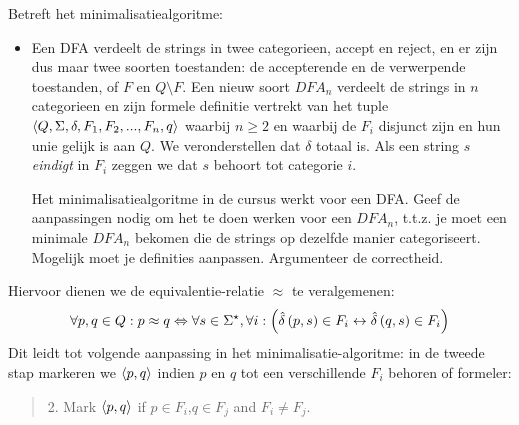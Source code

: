 \documentclass{article}
\begin{document}
\begin{question}
Betreft het minimalisatiealgoritme:
\begin{itemize}

\item[]
Een DFA verdeelt de strings in twee categorieen, accept en reject, en
er zijn dus maar twee soorten toestanden: de accepterende en de
verwerpende toestanden, of $F$ en $Q\setminus F$. Een nieuw soort
$DFA_n$ verdeelt de strings in $n$ categorieen en zijn formele
definitie vertrekt van het tuple
$\left\langle Q,\Sigma,\delta,F_1,F_2,...,F_n,q \right\rangle$ waarbij $n \geq 2$ en
waarbij de $F_i$ disjunct zijn en hun unie gelijk is aan $Q$. We
veronderstellen dat $\delta$ totaal is. Als een string $s$ {\em eindigt}
in $F_i$ zeggen we dat $s$ behoort tot categorie $i$.

Het minimalisatiealgoritme in de cursus werkt voor een DFA. Geef de
aanpassingen nodig om het te doen werken voor een $DFA_n$, t.t.z. je
moet een minimale $DFA_n$ bekomen die de strings op dezelfde manier
categoriseert. Mogelijk moet je definities aanpassen. Argumenteer
de correctheid.

\end{itemize}
\begin{answer}
Hiervoor dienen we de equivalentie-relatie $\approx$ te veralgemenen:
\begin{equation}
\forall p,q\in Q:p\approx q\Leftrightarrow\forall s\in\Sigma^{\star},\forall i:\left( \hat{\delta}\left( p,s \right)\in F_i\leftrightarrow \hat{\delta}\left( q,s \right)\in F_i \right)
\end{equation}
Dit leidt tot volgende aanpassing in het minimalisatie-algoritme: in de tweede stap markeren we $\left\langle p,q \right\rangle$ indien $p$ en $q$ tot een verschillende $F_i$ behoren of formeler:
\begin{quote}
2. Mark $\left\langle p,q \right\rangle$ if $p\in F_i$,$q\in F_j$ and $F_i\neq F_j$.
\end{quote}
\end{answer}
\end{question}
\end{document}
